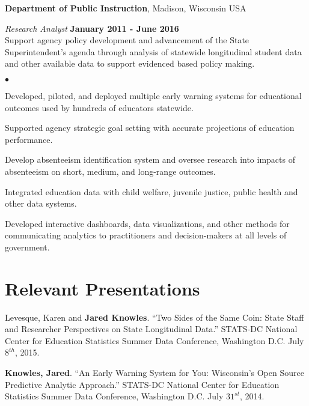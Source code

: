 \documentclass[margin,line]{res}
\newenvironment{list2}{
  \begin{list}{$\bullet$}{%
      \setlength{\itemsep}{0in}
      \setlength{\parsep}{0in} \setlength{\parskip}{0in}
      \setlength{\topsep}{0in} \setlength{\partopsep}{0in} 
      \setlength{\leftmargin}{0.2in}}}{\end{list}}
\begin{document}
\begin{resume}
{\bf Department of Public Instruction}, Madison, Wisconsin USA

\vspace{-.3cm}
{\em Research Analyst} \hfill {\bf January 2011 - June 2016}\\
Support agency policy development and advancement of the State Superintendent's agenda through analysis of statewide longitudinal student data and other available data to support evidenced based policy making. 
\begin{list2}
\item Developed, piloted, and deployed multiple early warning systems for educational outcomes 
used by hundreds of educators statewide. 
\item Supported agency strategic goal setting with accurate projections of education performance.
\item Develop absenteeism identification system and oversee research into impacts of 
absenteeism on short, medium, and long-range outcomes.
\item Integrated education data with child welfare, juvenile justice, public health and other 
data systems. 
\item Developed interactive dashboards, data visualizations, and other methods for communicating 
analytics to practitioners and decision-makers at all levels of government.
\end{list2}

\section{\sc Relevant Presentations}

Levesque, Karen and \textbf{Jared Knowles}. ``Two Sides of the Same Coin: State 
Staff and Researcher Perspectives on State Longitudinal Data.'' STATS-DC National Center for Education Statistics Summer Data Conference, Washington D.C. July $8^{th}$, 2015.


\textbf{Knowles, Jared}. ``An Early Warning System for You: Wisconsin’s Open Source Predictive Analytic Approach.'' STATS-DC National Center for Education Statistics Summer Data Conference, Washington D.C. July $31^{st}$, 2014.



\end{resume}
\end{document}
